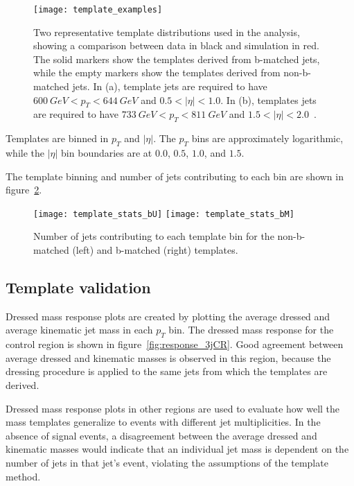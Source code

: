 \begin{figure}[!ht]
    \texttt{[image: template\_examples]}
    \caption{Two representative template distributions used in the analysis, showing a comparison between data in black and simulation in red.
    The solid markers show the templates derived from b-matched jets, while the empty markers show the templates derived from non-b-matched jets.
    In (a), template jets are required to have $600~GeV < p_{T} < 644~GeV$ and $0.5 <|\eta|<1.0$.
    In (b), templates jets are required to have $733~GeV < p_{T} < 811~GeV$ and $1.5<|\eta|<2.0$~\cite{paper-plb}.}
    \label{fig:template_examples}
\end{figure}

Templates are binned in $p_T$ and $|\eta|$.
The $p_T$ bins are approximately logarithmic, while the $|\eta|$ bin boundaries are at $0.0$, $0.5$, $1.0$, and $1.5$.

The template binning and number of jets contributing to each bin are shown in figure~\ref{fig:template_stats}.

\begin{figure}[!ht]
    \texttt{[image: template\_stats\_bU]}
    \texttt{[image: template\_stats\_bM]}
    \caption{Number of jets contributing to each template bin for the non-b-matched (left) and b-matched (right) templates.}
    \label{fig:template_stats}
\end{figure}

\subsection{Template validation} \label{subsec:template_validation}
Dressed mass response plots are created by plotting the average dressed and average kinematic jet mass in each $p_T$ bin.
The dressed mass response for the control region is shown in figure~\ref{fig:response_3jCR}.
Good agreement between average dressed and kinematic masses is observed in this region,
because the dressing procedure is applied to the same jets from which the templates are derived.

Dressed mass response plots in other regions are used to evaluate how well the mass templates generalize to events with different jet multiplicities.
In the absence of signal events, a disagreement between the average dressed and kinematic masses would indicate that an individual jet mass is
dependent on the number of jets in that jet's event, violating the assumptions of the template method.

